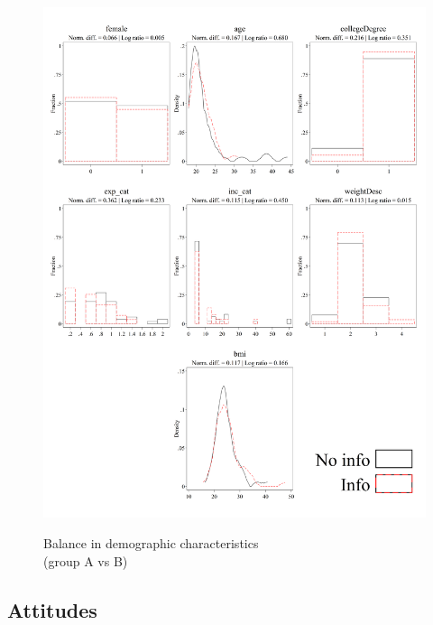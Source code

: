 \documentclass[12pt]{article}
\begin{document}
\begin{figure}[ht]
  \caption{Balance in demographic characteristics \\ (group A vs B)}\label{fig:group2_demographics}
  \begin{center}
  {\includegraphics[width=1\textwidth]{./figures/covDifTreat_0_demographics.png}}
  \end{center}
\end{figure}

\FloatBarrier

\clearpage

\subsection{Attitudes}
\end{document}
